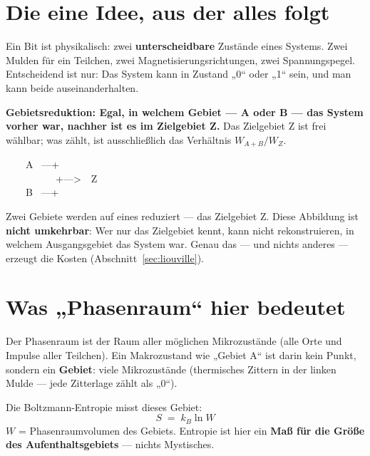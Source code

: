 \section{Die eine Idee, aus der alles folgt}

Ein Bit ist physikalisch: zwei \textbf{unterscheidbare} Zustände eines Systems.
Zwei Mulden für ein Teilchen, zwei Magnetisierungsrichtungen, zwei Spannungspegel.
Entscheidend ist nur: Das System kann in Zustand „0“ oder „1“ sein, und man kann
beide auseinanderhalten.

\textbf{Gebietsreduktion: Egal, in welchem Gebiet --- A oder B --- das System
vorher war, nachher ist es im Zielgebiet Z.} Das Zielgebiet Z ist frei wählbar;
was zählt, ist ausschließlich das Verhältnis $W_{A+B}/W_Z$.

\begin{center}
\begin{minipage}{0.42\textwidth}
\ttfamily\small
\begin{tabbing}
\ \ \ \ A \ ---+\\
\ \ \ \ \ \ \ \ \ \ +--->\ \ Z\\
\ \ \ \ B \ ---+
\end{tabbing}
\end{minipage}
\end{center}

Zwei Gebiete werden auf eines reduziert --- das Zielgebiet Z. Diese Abbildung ist
\textbf{nicht umkehrbar}: Wer nur das Zielgebiet kennt, kann nicht rekonstruieren,
in welchem Ausgangsgebiet das System war. Genau das --- und nichts anderes ---
erzeugt die Kosten (Abschnitt~\ref{sec:liouville}).

\section{Was „Phasenraum“ hier bedeutet}

Der Phasenraum ist der Raum aller möglichen Mikrozustände (alle Orte und Impulse
aller Teilchen). Ein Makrozustand wie „Gebiet A“ ist darin kein Punkt, sondern ein
\textbf{Gebiet}: viele Mikrozustände (thermisches Zittern in der linken Mulde ---
jede Zitterlage zählt als „0“).

\LS Die Boltzmann-Entropie misst dieses Gebiet:
\[
  S \;=\; k_B \ln W
\]
$W$ = Phasenraumvolumen des Gebiets. Entropie ist hier ein \textbf{Maß für die
Größe des Aufenthaltsgebiets} --- nichts Mystisches.

